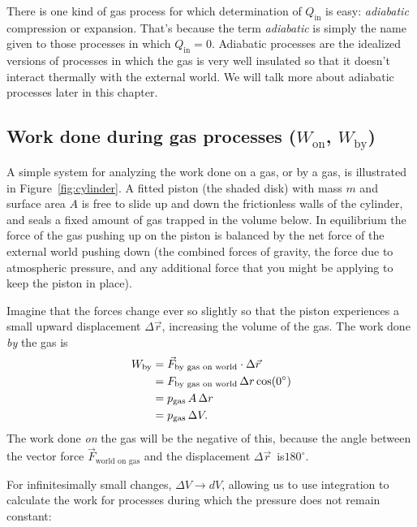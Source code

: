 There is one kind of gas process for which determination  of $Q_\text{in}$ is 
easy: \textit{adiabatic} compression or expansion. That's because 
the term \textit{adiabatic} is simply the name given to those processes in 
which $Q_\text{in}=0$.  Adiabatic processes are the idealized versions of 
processes in which the gas is very well insulated so that it doesn't 
interact thermally with the external world.  We will talk more about 
adiabatic processes later in this chapter. 

\subsection*{Work done during gas processes ($W_\text{on}$, $W_\text{by}$)}

\label{sec:CalcWork}

A simple system for analyzing the work done on a gas, or by a gas,
is illustrated in Figure~\ref{fig:cylinder}.  A fitted piston (the shaded disk)
with mass $m$ and surface area $A$ is free to slide up and down the 
frictionless walls of the cylinder, and seals a fixed 
amount of gas trapped in the volume below.  
In equilibrium the force of the gas pushing up on the piston
is balanced by the net force of the external world 
pushing down (the combined forces of gravity, the force due to atmospheric  
pressure, and any additional force that you might be applying 
to keep the piston in place).

Imagine that the forces change ever so slightly so that the 
piston experiences a small upward displacement $\Delta\vec{r}$,
increasing the volume of the gas.  The work done 
\textit{by} the gas is 
\begin{eqnarray}
W_\text{by} =\mathstrut & \vec{F}_\text{by gas on world}\cdot \Delta\vec{r} \\ 
            =\mathstrut & F_\text{by gas on world}\, \Delta r \cos(0^\circ) \\
            =\mathstrut & p_\text{gas}\, A\, \Delta r  \\
            =\mathstrut & p_\text{gas}\, \Delta V.
\end{eqnarray}
The work done \textit{on} the gas will be the negative of this, because
the angle between the vector force $\vec{F}_\text{world on gas}$ 
and the displacement $\Delta \vec{r}$\,  is$ 180^\circ$.

For infinitesimally small changes, $\Delta V \longrightarrow dV$, allowing
us to use integration to  calculate the work for processes during which
the pressure does not remain constant:

